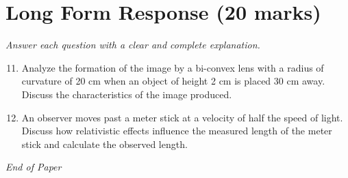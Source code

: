 \documentclass[12pt]{article}
\begin{document}
\section*{Long Form Response (20 marks)}
\textit{Answer each question with a clear and complete explanation.}
\begin{enumerate}[label=\arabic*.]
\setcounter{enumi}{10}
\item Analyze the formation of the image by a bi-convex lens with a radius of curvature of 20 cm
when an object of height 2 cm is placed 30 cm away. Discuss the characteristics of the
image produced.
\item An observer moves past a meter stick at a velocity of half the speed of light. Discuss how
relativistic effects influence the measured length of the meter stick and calculate the
observed length.
\end{enumerate}

\vfill
\noindent\textit{End of Paper}
\end{document}
